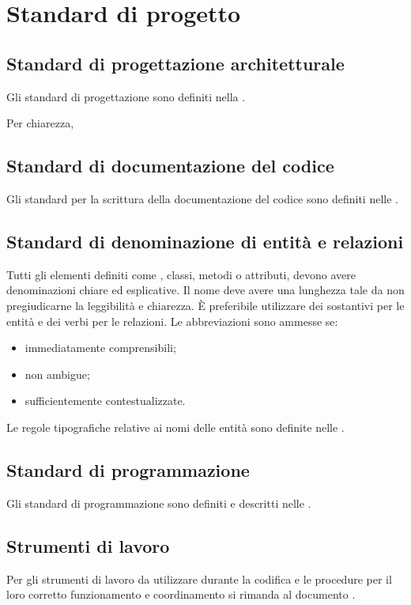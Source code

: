 \section{Standard di progetto}

\subsection{Standard di progettazione architetturale}
Gli standard di progettazione sono definiti nella \SpecificaTecnica{}.

Per chiarezza, %

\subsection{Standard di documentazione del codice}
Gli standard per la scrittura della documentazione del codice sono definiti nelle \NormeDiProgetto{}.

\subsection{Standard di denominazione di entità e relazioni}
Tutti gli elementi definiti come , classi, metodi o attributi, devono avere denominazioni chiare ed esplicative. Il nome deve avere una lunghezza tale da non pregiudicarne la leggibilità e chiarezza. \`E preferibile utilizzare dei sostantivi per le entità e dei verbi per le relazioni. Le abbreviazioni sono ammesse se:
\begin{itemize}
	\item immediatamente comprensibili; 
	\item non ambigue;
	\item sufficientemente contestualizzate.
\end{itemize}

Le regole tipografiche relative ai nomi delle entità sono definite nelle \NormeDiProgetto{}.

\subsection{Standard di programmazione}
Gli standard di programmazione sono definiti e descritti nelle \NormeDiProgetto{}.

\subsection{Strumenti di lavoro}
Per gli strumenti di lavoro da utilizzare durante la codifica e le procedure per il loro corretto funzionamento e coordinamento si rimanda al documento \NormeDiProgetto{}.